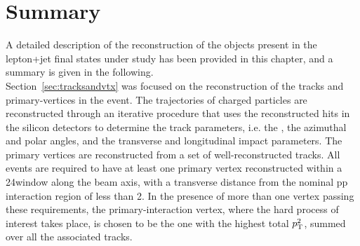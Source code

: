  

 

  
 
   

\section{Summary}

A detailed description of the reconstruction of the objects present in the lepton+jet final states under study has been provided in this chapter, and a summary is given in the following.\\

Section~\ref{sec:tracksandvtx} was focused on the reconstruction of the tracks and primary-vertices in the event.
The trajectories of charged particles are reconstructed through an iterative procedure that uses the reconstructed hits in the silicon detectors to determine the track parameters, i.e. the \pt, the azimuthal and polar angles, and the transverse and longitudinal impact parameters.
The primary vertices are reconstructed from a set of well-reconstructed tracks.
All events are required to have at least one primary vertex reconstructed within a 24\cm window along the beam axis, with a transverse distance from the nominal pp interaction region of less than 2\cm. In the presence of more than one vertex passing these requirements, the primary-interaction vertex, where the hard process of interest takes place, is chosen to be the one with the highest total $p_{\mathrm{T}}^2$, summed over all the associated tracks.\\

